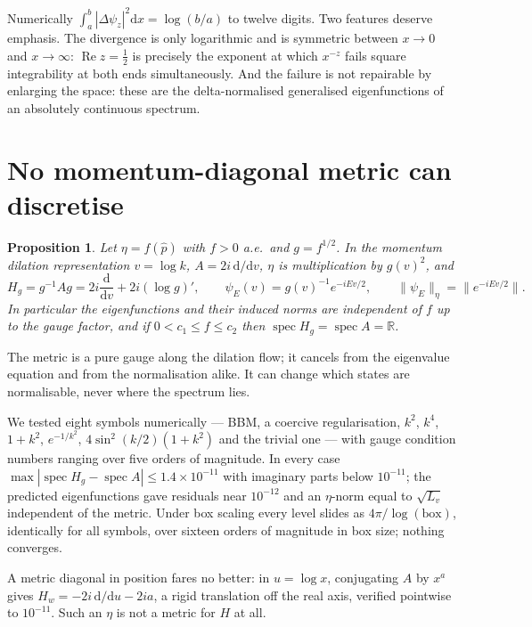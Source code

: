 \documentclass[11pt,a4paper]{article}
\newtheorem{proposition}[theorem]{Proposition}
\theoremstyle{remark}
\newcommand{\R}{\mathbb{R}}
\newcommand{\dd}{\mathrm{d}}
\DeclareMathOperator{\spec}{spec}
\begin{document}
Numerically $\int_a^b|\Delta\psi_z|^2\dd x=\log(b/a)$ to twelve digits. Two features deserve
emphasis. The divergence is only logarithmic and is symmetric between $x\to0$ and $x\to\infty$:
$\operatorname{Re}z=\frac12$ is precisely the exponent at which $x^{-z}$ fails square integrability
at both ends simultaneously. And the failure is not repairable by enlarging the space: these are
the delta-normalised generalised eigenfunctions of an absolutely continuous spectrum.

\section{No momentum-diagonal metric can discretise}\label{sec:nogo}

\begin{proposition}\label{prop:gauge}
Let $\eta=f(\hat p)$ with $f>0$ a.e.\ and $g=f^{1/2}$. In the momentum dilation representation
$v=\log k$, $A=2i\,\dd/\dd v$, $\eta$ is multiplication by $g(v)^2$, and
\[
H_g=g^{-1}Ag=2i\frac{\dd}{\dd v}+2i(\log g)',
\qquad
\psi_E(v)=g(v)^{-1}e^{-iEv/2},
\qquad
\|\psi_E\|_{\eta}=\bigl\|e^{-iEv/2}\bigr\| .
\]
In particular the eigenfunctions and their induced norms are independent of $f$ up to the gauge
factor, and if $0<c_1\le f\le c_2$ then $\spec H_g=\spec A=\R$.
\end{proposition}

The metric is a pure gauge along the dilation flow; it cancels from the eigenvalue equation and
from the normalisation alike. It can change which states are normalisable, never where the
spectrum lies.

We tested eight symbols numerically --- BBM, a coercive regularisation, $k^2$, $k^4$, $1+k^2$,
$e^{-1/k^2}$, $4\sin^2(k/2)(1+k^2)$ and the trivial one --- with gauge condition numbers ranging
over five orders of magnitude. In every case
$\max|\spec H_g-\spec A|\le1.4\times10^{-11}$ with imaginary parts below $10^{-11}$; the predicted
eigenfunctions gave residuals near $10^{-12}$ and an $\eta$-norm equal to $\sqrt{L_v}$ independent
of the metric. Under box scaling every level slides as $4\pi/\log(\text{box})$, identically for all
symbols, over sixteen orders of magnitude in box size; nothing converges.

A metric diagonal in position fares no better: in $u=\log x$, conjugating $A$ by $x^a$ gives
$H_w=-2i\,\dd/\dd u-2ia$, a rigid translation off the real axis, verified pointwise to $10^{-11}$.
Such an $\eta$ is not a metric for $H$ at all.
\end{document}
